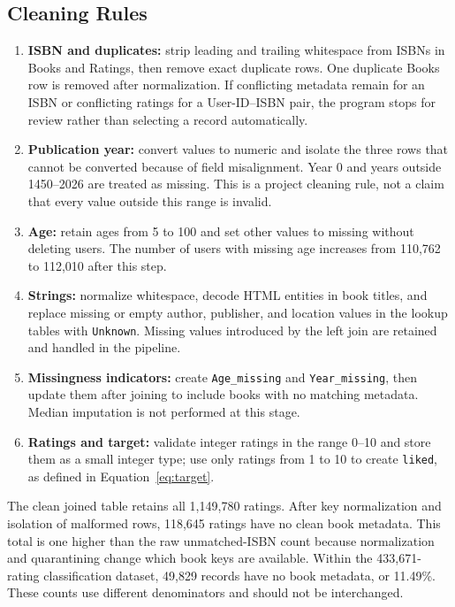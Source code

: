 \documentclass[12pt,a4paper]{article}
\newcommand{\code}[1]{\texttt{#1}}
\begin{document}
\subsection{Cleaning Rules}
\begin{enumerate}
  \item \textbf{ISBN and duplicates:} strip leading and trailing whitespace from ISBNs in Books and
  Ratings, then remove exact duplicate rows. One duplicate Books row is removed after normalization.
  If conflicting metadata remain for an ISBN or conflicting ratings for a User-ID--ISBN pair, the
  program stops for review rather than selecting a record automatically.
  \item \textbf{Publication year:} convert values to numeric and isolate the three rows that cannot
  be converted because of field misalignment. Year 0 and years outside 1450--2026 are treated as
  missing. This is a project cleaning rule, not a claim that every value outside this range is invalid.
  \item \textbf{Age:} retain ages from 5 to 100 and set other values to missing without deleting users.
  The number of users with missing age increases from 110,762 to 112,010 after this step.
  \item \textbf{Strings:} normalize whitespace, decode HTML entities in book titles, and replace
  missing or empty author, publisher, and location values in the lookup tables with \code{Unknown}.
  Missing values introduced by the left join are retained and handled in the pipeline.
  \item \textbf{Missingness indicators:} create \code{Age\_missing} and \code{Year\_missing}, then
  update them after joining to include books with no matching metadata. Median imputation is not
  performed at this stage.
  \item \textbf{Ratings and target:} validate integer ratings in the range 0--10 and store them as a
  small integer type; use only ratings from 1 to 10 to create \code{liked}, as defined in
  Equation~\eqref{eq:target}.
\end{enumerate}

The clean joined table retains all 1,149,780 ratings. After key normalization and isolation of
malformed rows, 118,645 ratings have no clean book metadata. This total is one higher than the raw
unmatched-ISBN count because normalization and quarantining change which book keys are available. Within the 433,671-rating classification
dataset, 49,829 records have no book metadata, or 11.49\%. These counts use different denominators
and should not be interchanged.
\end{document}
